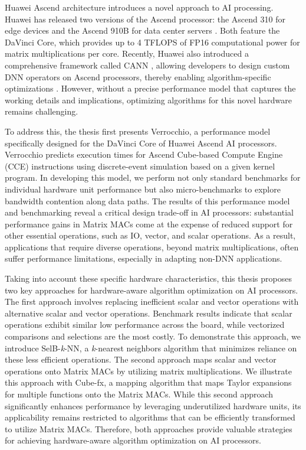 Huawei Ascend architecture \cite{DBLP:conf/hotchips/LiaoTXZ19} introduces a novel approach to AI processing. Huawei has released two versions of the Ascend processor: the Ascend 310 for edge devices \cite{DBLP:conf/hotchips/LiaoTXZ19} and the Ascend 910B for data center servers \cite{910}. Both feature the DaVinci Core, which provides up to 4 TFLOPS of FP16 computational power for matrix multiplications per core. Recently, Huawei also introduced a comprehensive framework called CANN \cite{CANN}, allowing developers to design custom DNN operators on Ascend processors, thereby enabling algorithm-specific optimizations \cite{DBLP:conf/ipps/RohwedderCAACW21, DBLP:conf/icpp/JiW21}. However, without a precise performance model that captures the working details and implications, optimizing algorithms for this novel hardware remains challenging.

To address this, the thesis first presents Verrocchio, a performance model specifically designed for the DaVinci Core of Huawei Ascend AI processors. Verrocchio predicts execution times for Ascend Cube-based Compute Engine (CCE) instructions using discrete-event simulation based on a given kernel program. In developing this model, we perform not only standard benchmarks for individual hardware unit performance but also micro-benchmarks to explore bandwidth contention along data paths. The results of this performance model and benchmarking reveal a critical design trade-off in AI processors: substantial performance gains in Matrix MACs come at the expense of reduced support for other essential operations, such as IO, vector, and scalar operations. As a result, applications that require diverse operations, beyond matrix multiplications, often suffer performance limitations, especially in adapting non-DNN applications.

Taking into account these specific hardware characteristics, this thesis proposes two key approaches for hardware-aware algorithm optimization on AI processors. The first approach involves replacing inefficient scalar and vector operations with alternative scalar and vector operations. Benchmark results indicate that scalar operations exhibit similar low performance across the board, while vectorized comparisons and selections are the most costly. To demonstrate this approach, we introduce SelB-\textit{k}-NN, a \textit{k}-nearest neighbors algorithm that minimizes reliance on these less efficient operations. The second approach maps scalar and vector operations onto Matrix MACs by utilizing matrix multiplications. We illustrate this approach with Cube-fx, a mapping algorithm that maps Taylor expansions for multiple functions onto the Matrix MACs. While this second approach significantly enhances performance by leveraging underutilized hardware units, its applicability remains restricted to algorithms that can be efficiently transformed to utilize Matrix MACs. Therefore, both approaches provide valuable strategies for achieving hardware-aware algorithm optimization on AI processors.

